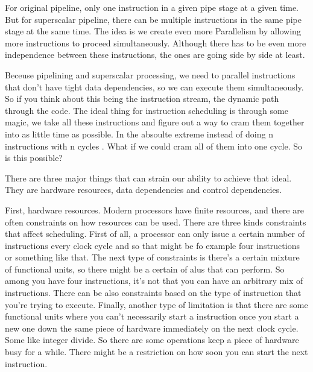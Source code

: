 For original pipeline, only one instruction in a given pipe stage at a given time.
But for superscalar pipeline, there can be multiple instructions in the same pipe
stage at the same time. The idea is we create even more Parallelism by allowing more 
instructions to proceed simultaneously. Although there has to be even more independence
between these instructions, the ones are going side by side at least. 
 
Beceuse pipelining and superscalar processing, we need to parallel instructions that don't have 
tight data dependencies, so we can execute them simultaneously. So if you think about this 
being the instruction stream, the dynamic path through the code. The ideal thing for instruction scheduling
is through some magic, we take all these instructions and figure out a way to cram them together
into as little time as possible. In the absoulte extreme instead of doing n instructions with n cycles
. What if we could cram all of them into one cycle. So is this possible?

There are three major things that can strain our ability to achieve that ideal. They are 
hardware resources, data dependencies and control dependencies. 

First, hardware resources. Modern processors have finite resources, and there are often constraints
on how resources can be used. There are three kinds constraints that affect scheduling. First of all,
a processor can only issue a certain number of instructions every clock cycle and so that might 
be fo example four instructions or something like that. The next type of constraints is there's
a certain mixture of functional units, so there might be a certain of alus that can perform. So 
among you have four instructions, it's not that you can have an arbitrary mix of instructions.
There can be also constraints based on the type of instruction that you're trying to execute. Finally,
another type of limitation is that there are some functional units where you can't necessarily start a instruction
once you start a new one down the same piece of hardware immediately on the next clock cycle.
Some like integer divide. So there are some operations keep a piece of hardware busy for a while.
There might be a restriction on how soon you can start the next instruction.

